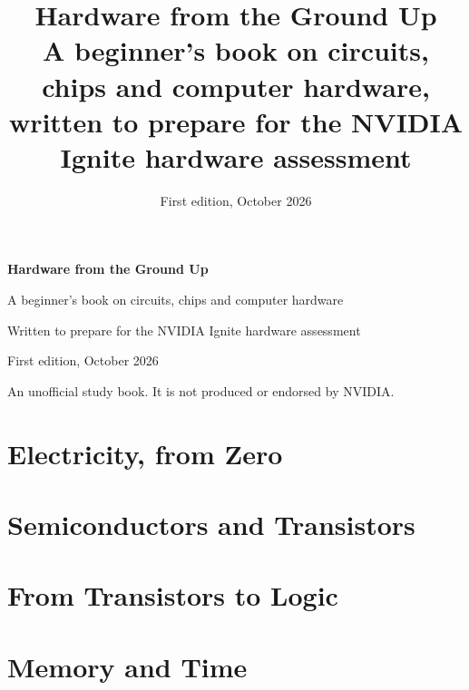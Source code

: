\documentclass[11pt,openany]{book}
\title{\Huge\bfseries Hardware from the Ground Up\\[0.6em]
  \Large\mdseries A beginner's book on circuits, chips and computer hardware,\\
  written to prepare for the NVIDIA Ignite hardware assessment}
\author{}
\date{First edition, October 2026}
\begin{document}
\frontmatter
\begin{titlepage}
  \centering
  \vspace*{3cm}
  {\Huge\bfseries Hardware from the Ground Up\par}
  \vspace{1.2em}
  {\Large A beginner's book on circuits, chips and computer hardware\par}
  \vspace{0.6em}
  {\large Written to prepare for the NVIDIA Ignite hardware assessment\par}
  \vfill
  \vfill
  {\large First edition, October 2026\par}
  \vspace{0.5em}
  {\small An unofficial study book. It is not produced or endorsed by NVIDIA.\par}
\end{titlepage}


\tableofcontents

\mainmatter

\part{Electricity, from Zero}




\part{Semiconductors and Transistors}




\part{From Transistors to Logic}




\part{Memory and Time}



\end{document}
